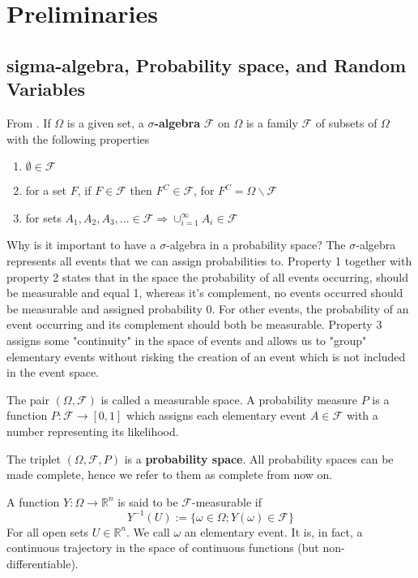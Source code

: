 \documentclass[12pt]{book}
\begin{document}
\tableofcontents
\chapter{Preliminaries}
\section{sigma-algebra, Probability space, and Random Variables}
From \cite{Oksendal14}. If $\Omega$ is a given set, a \textbf{$\sigma$-algebra} $\mathcal{F}$ on $\Omega$ is a family $\mathcal{F}$ of subsets of $\Omega$ with the following properties
\begin{enumerate}
\item $\emptyset \in \mathcal{F}$
\item for a set $F$, if $F\in \mathcal{F}$ then $F^C\in\mathcal{F}$, for $F^C= \Omega\backslash\mathcal{F}$
\item for sets $A_1,A_2,A_3,...\in\mathcal{F}\Rightarrow \cup_{i=1}^\infty A_i \in \mathcal{F}$
\end{enumerate}
Why is it important to have a $\sigma$-algebra in a probability space?
The $\sigma$-algebra represents all events that we can assign probabilities to. Property 1 together with property 2 states that in the space the probability of all events occurring, should be measurable and equal 1, whereas it's complement, no events occurred should be measurable and assigned probability 0. For other events, the probability of an event occurring and its complement should both be measurable. Property 3 assigns some "continuity" in the space of events and allows us to "group" elementary events without risking the creation of an event which is not included in the event space. 

The pair $(\Omega,\mathcal{F})$ is called a measurable space. A probability measure $P$ is a function $P:\mathcal{F}\rightarrow [0,1]$ which assigns each elementary event $A\in\mathcal{F}$ with a number representing its likelihood. 

The triplet $(\Omega,\mathcal{F},P)$ is a \textbf{probability space}. All probability spaces can be made complete, hence we refer to them as complete from now on. 

A function $Y:\Omega\rightarrow\mathbb{R}^n$ is said to be $\mathcal{F}$-measurable if
\begin{equation*}
Y^{-1}(U):=\{\omega\in \Omega ; Y(\omega)\in \mathcal{F}\}
\end{equation*}
For all open sets $U\in\mathbb{R}^n$. We call $\omega$ an elementary event. It is, in fact, a continuous trajectory in the space of continuous functions (but non-differentiable). 
\end{document}
